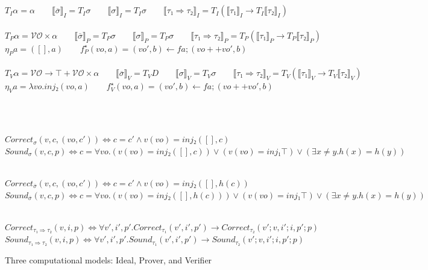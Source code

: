 \documentclass{acm_proc_article-sp}
\begin{document}
\begin{figure*}
\centering

    \\
   \qquad \\

   $ T_I \alpha = \alpha \qquad
   ⟦ \overline{σ} ⟧_I  = T_I σ \qquad
   ⟦ σ ⟧_I = T_I σ \qquad
   ⟦ τ₁ ⇒ τ₂ ⟧_I = T_I(⟦τ₁⟧_I → T_I ⟦τ₂⟧_I) $ \\

   \qquad \\

    $ T_P α = \mathcal{VO} × α \qquad
   ⟦ \overline{σ} ⟧_P  = T_P σ  \qquad
   ⟦σ⟧_P = T_P σ  \qquad  
   ⟦ τ₁ ⇒ τ₂ ⟧_P = T_P ( ⟦τ₁⟧_P → T_P ⟦ τ₂ ⟧_P )$ \\
   $       
   η_P a = ([], a) \qquad
   f^⋆_P(vo,a) = (vo',b) ← fa; (vo++vo',b) \qquad $ \\


   \qquad \\

    $ T_V \alpha = \mathcal{VO} → ⊤ + \mathcal{VO} × \alpha \qquad
    ⟦ \overline{σ} ⟧_V  = T_V D \qquad
    ⟦ σ ⟧_V  = T_V σ  \qquad
    ⟦ τ₁ ⇒ τ₂ ⟧_V = T_V (⟦ τ₁ ⟧_V → T_V ⟦ τ₂ ⟧_V) 
    $ \\
    $       η_V a = λvo.inj₂(vo, a) \qquad
      f^⋆_V(vo,a) = (vo',b) ← fa; (vo++vo',b) \qquad
    $

   \qquad \\

    \qquad

   \qquad \\

   $ Correct_σ (v,c,(vo,c')) ⇔ c = c' ∧ v(vo) = inj₂ ([], c) \qquad $ \\
   $ Sound_σ (v,c,p) ⇔ c = ∀ vo . (v(vo) = inj₂ ([], c)) ∨ (v(vo) = inj₁ ⊤) ∨ (∃ x ≠ y . h(x) = h(y)) $ \qquad

   \qquad \\

   $ Correct_{\overline{σ}} (v,c,(vo,c')) ⇔ c = c' ∧ v(vo) = inj₂ ([], h(c)) \qquad $ \\
   $ Sound_{\overline{σ}} (v,c,p) ⇔ c = ∀ vo . (v(vo) = inj₂ ([], h(c))) ∨ (v(vo) = inj₁ ⊤) ∨ (∃ x ≠ y . h(x) = h(y)) $ \qquad

   \qquad \\

   $ Correct_{τ₁ ⇒ τ₂} (v,i,p) ⇔ ∀ v',i',p' . Correct_{τ₁} (v',i',p') → Correct_{τ₂} (v';v, i';i, p';p) $ \\
   $ Sound_{τ₁ ⇒ τ₂} (v,i,p) ⇔ ∀ v',i',p' . Sound_{τ₁} (v',i',p') → Sound_{τ₂} (v';v, i';i, p';p) $ \\


\caption{Three computational models: Ideal, Prover, and Verifier}
\label{fig:models}
\end{figure*}
\end{document}
